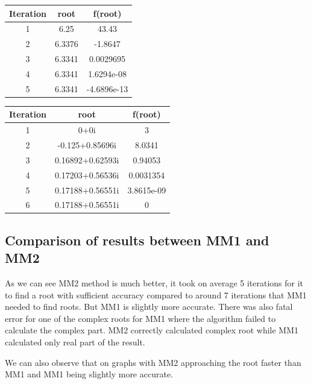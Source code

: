 \documentclass[12pt]{report}
\begin{document}
\begin{center}
  \begin{tabular}{| c  c c |}
\hline
Iteration & root         & f(root) \\
\hline
1   &     6.25    &       43.43 \\
\hline
2   &   6.3376    &     -1.8647 \\
\hline
3   &  6.3341     &  0.0029695 \\
\hline
4   &   6.3341    &  1.6294e-08 \\
\hline
5   &   6.3341    & -4.6896e-13 \\
\hline
\hline

\end{tabular}
\end{center}

\begin{center}
  \begin{tabular}{| c  c c |}
\hline
Iteration & root         & f(root) \\
\hline
1   &         0+0i          &            3 \\
\hline
2   &    -0.125+0.85696i    &       8.0341 \\
\hline
3   &   0.16892+0.62593i    &      0.94053 \\
\hline
4   &   0.17203+0.56536i    &    0.0031354  \\
\hline
5   &   0.17188+0.56551i    &   3.8615e-09  \\
\hline
6   &   0.17188+0.56551i    &            0  \\
\hline
\hline

\end{tabular}
\end{center}

\subsection{Comparison of results between MM1 and MM2}
As we can see MM2 method is much better, it took on average 5 iterations for it to find a root with sufficient accuracy compared to around 7 iterations that MM1 needed to find roots.  But MM1 is slightly more accurate. There was also fatal error for one of the complex roots for MM1 where the algorithm failed to calculate the complex part. MM2 correctly calculated complex root while MM1 calculated only real part of the result.

We can also observe that on graphs with MM2 approaching the root faster than MM1 and MM1 being slightly more accurate.
\end{document}
